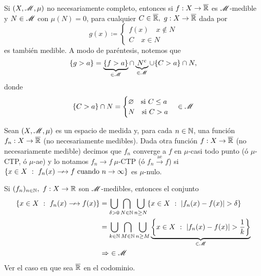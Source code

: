 
\begin{remark}
	Si $(X, \mathscr{M}, \mu)$ no necesariamente completo, entonces si $f : X \to \overline{\mathbb{R}}$ es $\mathscr{M}$-medible y $N \in \mathscr{M}$ con $\mu(N) = 0$, para cualquier $C \in \overline{\mathbb{R}},\ g : X \to \overline{\mathbb{R}}$ dada por 
	\[ g(x) \coloneq \begin{cases}
		f(x) \quad x \not\in N \\
		C \quad x \in N
	\end{cases} \]
	es también medible. A modo de paréntesis, notemos que
	\[ \{g > a\} = \underbrace{\{f > a\}}_{\in \mathscr{M}} \cap \underbrace{N^c}_{\in\mathscr{M}} \cup \{C > a\} \cap N, \]
	donde
	\[ \{C > a\} \cap N = \begin{cases}
		\varnothing \quad \text{si } C \leq a \\
		N \quad \text{si } C > a
	\end{cases} \in \mathscr{M} \]
\end{remark}

\begin{definition}
	Sean $(X, \mathscr{M}, \mu)$ es un espacio de medida y, para cada $n\in\mathbb{N}$, una función $f_n : X \to \overline{\mathbb{R}}$ (no necesariamente medibles). Dada otra función $f : X \to \overline{\mathbb{R}}$ (no necesariamente medible) decimos que $f_n$ converge a $f$ en $\mu$-casi todo punto (ó $\mu$-CTP, ó $\mu$-ae) y lo notamos $f_n \longrightarrow f \ \mu$-CTP (ó $f_n \stackrel{\text{ae}}{\longrightarrow} f$) si $\{x \in X \ : \ f_n(x) \longarrownot\longrightarrow f \text{ cuando } n \to \infty \}$ es $\mu$-nulo.
\end{definition}

\begin{remark}
	Si $(f_n)_{n\in\mathbb{N}},\ f : X \to \mathbb{R}$ son $\mathscr{M}$-medibles, entonces el conjunto
	\begin{align*}
		\{x \in X \ : \ f_n(x) \longarrownot\longrightarrow f(x)\} &= \bigcup_{\delta > 0} \bigcap_{N \in \N} \bigcup_{n \geq N} \{x \in X \ : \ | f_n(x) - f(x) | > \delta\} \\
		&= \bigcup_{k \in \N} \bigcap_{M \in \N} \bigcup_{n \geq M} \underbrace{\left\{x \in X \ : \ | f_n(x) - f(x) | > \frac{1}{k}\right\}}_{\in\mscr{M}} \\
		&\implies \ \in \mscr{M}
	\end{align*}
	Ver el caso en que sea $\overline{\mathbb{R}}$ en el codominio.
\end{remark}

